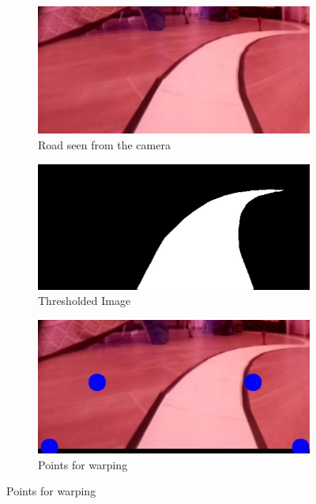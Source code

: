 \documentclass[12pt,a4paper]{article}
\begin{document}
\begin{large}
\begin{figure} [!hbp]
  \centering
    \begin{subfigure}[b]{0.3\textwidth}
    \centering
    \captionsetup{justification=centering}
      \includegraphics[width=\textwidth]{images/normal.jpg}
      \caption{Road seen from the camera}
      
    \end{subfigure}
    \hspace{0.1cm}
    \begin{subfigure}[b]{0.3\textwidth}
    \centering
    \captionsetup{justification=centering}
      \includegraphics[width=\textwidth]{images/thres.jpg}
      \caption{Thresholded Image \\}
      
    \end{subfigure}
    \hspace{0.1cm}
    \begin{subfigure}[b]{0.3\textwidth}
    \centering
    \captionsetup{justification=centering}
      \includegraphics[width=\textwidth]{images/warp.jpg}
      \caption{Points for warping\\}
      

\end{subfigure}
\end{figure}
\end{large}
\end{document}
